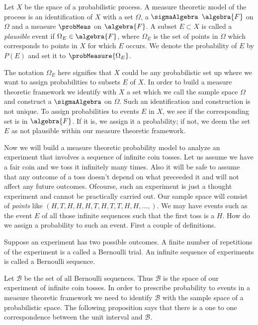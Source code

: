 \begin{Definition}[name=Measure theoretic probability model]
    Let $X$ be the space of a probabilistic process. A measure theoretic model of the
    process is an identification of $X$ with a set $\Omega$, a 
    $\sigmaAlgebra$ $\algebra{F}$ on $\Omega$ and a measure $\probMeas$ on $\algebra{F}$. 
    A subset $E\subset X$ is called a \emph{plausible} event if $\Omega_{E} \in \algebra{F}$, 
    where $\Omega_{E}$ is the set of 
    points in $\Omega$ which corresponds to points in $X$ for which $E$ occurs. 
    We denote the probability of $E$ by $P(E)$ and set it to $\probMeasure{\Omega_E}$.  
\end{Definition}
The notation $\Omega_{E}$ here signifies that $X$ could be any probabilistic set up where we
want to assign probabilities to subsets $E$ of $X$. In order to build a measure theoretic framework we
identify with $X$ a set which we call the sample space $\Omega$ and construct a $\sigmaAlgebra$ on $\Omega$. 
Such an identification and construction is not unique. To
assign probabilities to events $E$ in $X$, we see if the corresponding set is in $\algebra{F}$. If it is, we
assign it a probability; if not, we deem the set $E$ as not plausible within our measure theoretic framework.


Now we will build a measure theoretic probability model to analyze an experiment that involves a
sequence of infinite coin tosses. Let us assume we have a fair coin and we toss it infinitely many
times. Also it will be safe to assume that any outcome of a toss doesn't depend on what preceeded it
and will not affect any future outcomes. 
Ofcourse, such an experiment is just a thought experiment and cannot be practically carried
out. Our sample space will consist of \emph{points} like $(H,T,H,H,H,T,H,T,T,H,H,\dots,)$. We may
have events such as the event $E$ of all those infinite sequences such that the first toss is a $H$.
How do we assign a probability to such an event. First a couple of definitions.
\begin{Definition}[name=Bernoulli trial and sequences.]
    Suppose an experiment has two possible outcomes. A finite number of repetitions of the
    experiment is a called a Bernoulli trial. An infinite sequence of experiments is called a
    Bernoulli sequence.
\end{Definition}
Let $\mathcal{B}$ be the set of all Bernoulli sequences. Thus $\mathcal{B}$ is the space of
our experiment of infinite coin tosses. In order to prescribe probability to events in a measure
theoretic framework we need to identify $\mathcal{B}$ with the sample space of a probabilistic
space. The following proposition says that there is a one to one correspondence between the unit
interval and $\mathcal{B}$.

